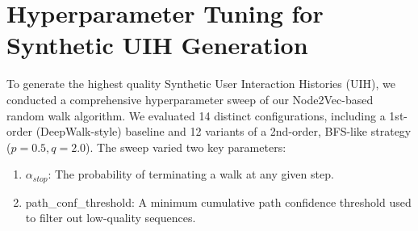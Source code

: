 \documentclass[]{fairmeta}
\begin{document}
\section{Hyperparameter Tuning for Synthetic UIH Generation}\label{sec:uih_parameter}
To generate the highest quality Synthetic User Interaction Histories (UIH), we conducted a comprehensive hyperparameter sweep of our Node2Vec-based random walk algorithm. We evaluated 14 distinct configurations, including a 1st-order (DeepWalk-style) baseline and 12 variants of a 2nd-order, BFS-like strategy ($p=0.5, q=2.0$). The sweep varied two key parameters:
\begin{enumerate}
    \item $\alpha_{stop}$: The probability of terminating a walk at any given step.
    \item path\_conf\_threshold: A minimum cumulative path confidence threshold used to filter out low-quality sequences.
\end{enumerate}
\end{document}
